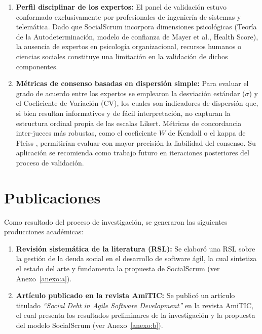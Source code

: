 \begin{enumerate}
    \item \textbf{Perfil disciplinar de los expertos:} El panel de validación estuvo conformado exclusivamente por profesionales de ingeniería de sistemas y telemática. Dado que SocialScrum incorpora dimensiones psicológicas (Teoría de la Autodeterminación, modelo de confianza de Mayer et al., Health Score), la ausencia de expertos en psicología organizacional, recursos humanos o ciencias sociales constituye una limitación en la validación de dichos componentes.

    \item \textbf{Métricas de consenso basadas en dispersión simple:} Para evaluar el grado de acuerdo entre los expertos se emplearon la desviación estándar ($\sigma$) y el Coeficiente de Variación (CV), los cuales son indicadores de dispersión que, si bien resultan informativos y de fácil interpretación, no capturan la estructura ordinal propia de las escalas Likert. Métricas de concordancia inter-jueces más robustas, como el coeficiente $W$ de Kendall \cite{Kendall1948} o el kappa de Fleiss \cite{Fleiss1971}, permitirían evaluar con mayor precisión la fiabilidad del consenso. Su aplicación se recomienda como trabajo futuro en iteraciones posteriores del proceso de validación.
\end{enumerate}

\section{Publicaciones}
\label{sec:publicaciones}

Como resultado del proceso de investigación, se generaron las siguientes producciones académicas:

\begin{enumerate}
    \item \textbf{Revisión sistemática de la literatura (RSL):} Se elaboró una RSL sobre la gestión de la deuda social en el desarrollo de software ágil, la cual sintetiza el estado del arte y fundamenta la propuesta de SocialScrum (ver Anexo~\ref{anexo:a}).

    \item \textbf{Artículo publicado en la revista AmiTIC:} Se publicó un artículo titulado \textit{``Social Debt in Agile Software Development''} en la revista AmiTIC, el cual presenta los resultados preliminares de la investigación y la propuesta del modelo SocialScrum (ver Anexo~\ref{anexo:b}).
\end{enumerate}

